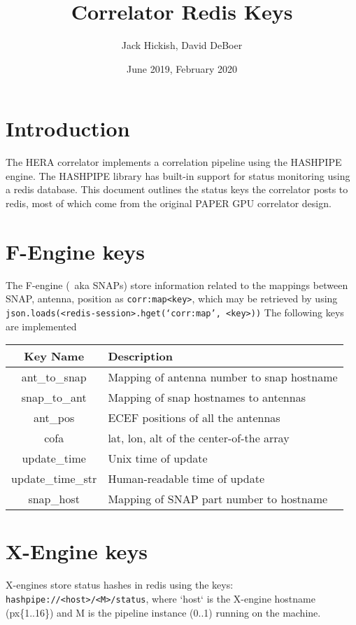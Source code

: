 \documentclass{article}
\title{Correlator Redis Keys}
\author{Jack Hickish, David DeBoer}
\date{June 2019, February 2020}
\begin{document}
\maketitle

\section{Introduction}
The HERA correlator implements a correlation pipeline using the HASHPIPE engine. The HASHPIPE library has built-in support for status monitoring using a redis database.
This document outlines the status keys the correlator posts to redis, most of which come from the original PAPER GPU correlator design.

\section{F-Engine keys}

The F-engine (~aka SNAPs) store information related to the mappings between SNAP, antenna, position as \texttt{corr:map<key>}, which may be retrieved by using \texttt{json.loads(<redis-session>.hget(`corr:map', <key>))}
The following keys are implemented

\begin{centering}
\begin{tabular}{c p{}}
\hline
Key Name & Description \\
\hline
\hline
ant\_to\_snap           & Mapping of antenna number to snap hostname \\
snap\_to\_ant           & Mapping of snap hostnames to antennas \\
ant\_pos                   & ECEF positions of all the antennas \\
cofa                          & lat, lon, alt of the center-of-the array \\
update\_time           & Unix time of update \\
update\_time\_str     & Human-readable time of update \\
snap\_host                & Mapping of SNAP part number to hostname \\
\end{tabular}
\end{centering}


\section{X-Engine keys}

X-engines store status hashes in redis using the keys: \texttt{hashpipe://<host>/<M>/status}, where `host` is the X-engine hostname (px\{1..16\}) and M is the pipeline instance (0..1) running on the machine.
\end{document}

